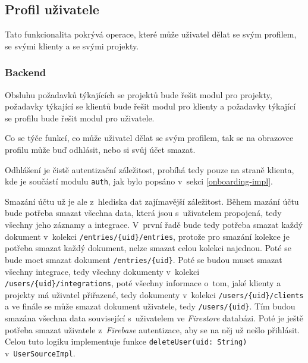 \subsection{Profil uživatele}

Tato funkcionalita pokrývá operace, které může uživatel dělat se svým profilem, se svými klienty a se svými projekty. 

\subsubsection{Backend}

Obsluhu požadavků týkajících se projektů bude řešit modul pro projekty, požadavky týkající se klientů bude řešit modul pro klienty a požadavky týkající se profilu bude řešit modul pro uživatele.

Co se týče funkcí, co může uživatel dělat se svým profilem, tak se na obrazovce profilu může buď odhlásit, nebo si svůj účet smazat.

Odhlášení je čistě autentizační záležitost, probíhá tedy pouze na straně klienta, kde je součástí modulu \texttt{auth}, jak bylo popsáno v~sekci \ref{onboarding-impl}.

Smazání účtu už je ale z~hlediska dat zajímavější záležitost. Během mazání účtu bude potřeba smazat všechna data, která jsou s~uživatelem propojená, tedy všechny jeho záznamy a integrace. V~první řadě bude tedy potřeba smazat každý dokument v~kolekci \texttt{/entries/\{uid\}/entries}, protože pro smazání kolekce je potřeba smazat každý dokument, nelze smazat celou kolekci najednou. Poté se bude moct smazat dokument \texttt{/entries/\{uid\}}. Poté se budou muset smazat všechny integrace, tedy všechny dokumenty v~kolekci \texttt{/users/\{uid\}/integrations}, poté všechny informace o~tom, jaké klienty a projekty má uživatel přiřazené, tedy dokumenty v~kolekci \texttt{/users/\{uid\}/clients} a ve finále se může smazat dokument uživatele, tedy \texttt{/users/\{uid\}}. Tím budou smazána všechna data související s~uživatelem ve \emph{Firestore} databázi. Poté je ještě potřeba smazat uživatele z~\emph{Firebase} autentizace, aby se na něj už nešlo přihlásit. Celou tuto logiku implementuje funkce \texttt{deleteUser(uid: String)} v~\texttt{UserSourceImpl}.

